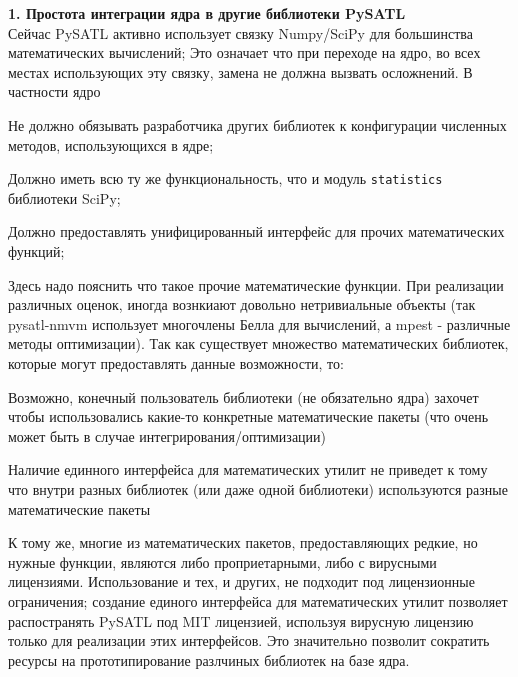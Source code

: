 
\textbf{1. Простота интеграции ядра в другие библиотеки PySATL}\\
Сейчас PySATL активно использует связку Numpy/SciPy для большинства математических вычислений; Это означает что при переходе на ядро, во всех местах использующих эту связку, замена не должна вызвать осложнений. В частности ядро 
\begin{itemizecmp}
    \item Не должно обязывать разработчика других библиотек к конфигурации численных методов, использующихся в ядре;
    \item Должно иметь всю ту же функциональность, что и модуль \texttt{statistics} библиотеки SciPy;
    \item Должно предоставлять унифицированный интерфейс для прочих математических функций;
\end{itemizecmp}

Здесь надо пояснить что такое прочие математические функции. При реализации различных оценок, иногда вознкиают довольно нетривиальные объекты (так pysatl-nmvm использует многочлены Белла для вычислений, а mpest - различные методы оптимизации). Так как существует множество математических библиотек, которые могут предоставлять данные возможности, то:
\begin{enumeratecmp}
    \item Возможно, конечный пользователь библиотеки (не обязательно ядра) захочет чтобы использовались какие-то конкретные математические пакеты (что очень может быть в случае интегрирования/оптимизации)
    \item Наличие единного интерфейса для математических утилит не приведет к тому что внутри разных библиотек (или даже одной библиотеки) используются разные математические пакеты 
\end{enumeratecmp}

К тому же, многие из математических пакетов, предоставляющих редкие, но нужные функции, являются либо проприетарными, либо с вирусными лицензиями. Использование и тех, и других, не подходит под лицензионные ограничения; создание единого интерфейса для математических утилит позволяет распостранять PySATL под MIT лицензией, используя вирусную лицензию только для реализации этих интерфейсов. Это значительно позволит сократить ресурсы на прототипирование разлчиных библиотек на базе ядра.

